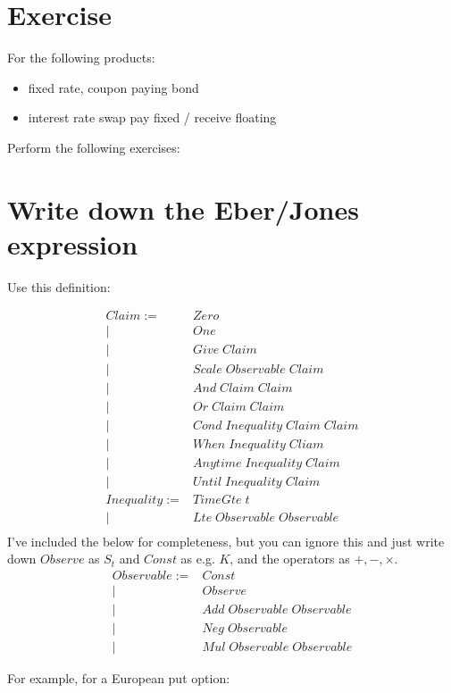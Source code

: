 \documentclass[a4paper]{article}
\begin{document}
\section*{Exercise}
For the following products:

\begin{itemize}
\item fixed rate, coupon paying bond
\item interest rate swap pay fixed / receive floating
\end{itemize}

Perform the following exercises:

\section{Write down the Eber/Jones expression}

Use this definition:

\begin{align*}
Claim := & Zero \\
|& One \\
|& Give \; Claim \\
|& Scale \; Observable \; Claim \\
|& And \; Claim \; Claim \\
|& Or \; Claim \; Claim \\
|& Cond \; Inequality \; Claim \; Claim \\
|& When \; Inequality \; Cliam \\
|& Anytime \; Inequality \; Claim \\
|& Until \; Inequality \; Claim \\
Inequality := & TimeGte \; t \\
| & Lte \; Observable \; Observable \\
\end{align*}
I've included the below for completeness, but you can ignore this and just write down $Observe$ as $S_t$ and $Const$ as e.g. $K$, and the operators as $+, -, \times$.
\begin{align*}
Observable := & Const \\
| & Observe \\
| & Add \; Observable \; Observable \\
| & Neg \; Observable \\
| & Mul \; Observable \; Observable
\end{align*}


For example, for a European put option:
\end{document}
